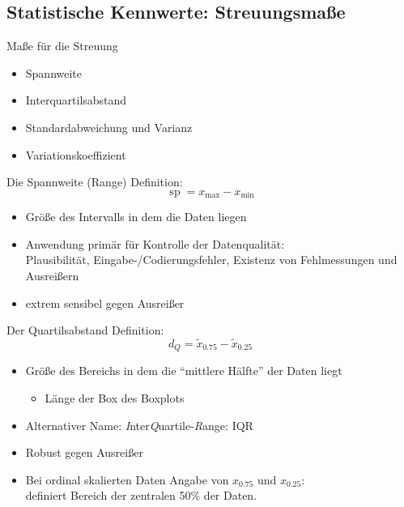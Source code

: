 \documentclass[
  10pt,
  ignorenonframetext,
]{beamer}
\providecommand{\tightlist}{%
  \setlength{\itemsep}{0pt}\setlength{\parskip}{0pt}}
\begin{document}
\hypertarget{statistische-kennwerte-streuungsmauxdfe}{%
\subsection{Statistische Kennwerte:
Streuungsmaße}\label{statistische-kennwerte-streuungsmauxdfe}}

\begin{frame}{Maße für die Streuung}
\protect\hypertarget{mauxdfe-fuxfcr-die-streuung}{}
\begin{itemize}
\tightlist
\item
  Spannweite
\item
  Interquartilsabstand
\item
  Standardabweichung und Varianz
\item
  Variationskoeffizient
\end{itemize}
\end{frame}

\begin{frame}{Die Spannweite (Range)}
\protect\hypertarget{die-spannweite-range}{}
Definition: \begin{equation*}
  \operatorname{sp} = x_{\max} - x_{\min}
\end{equation*}

\begin{itemize}
\tightlist
\item
  Größe des Intervalls in dem die Daten liegen
\item
  Anwendung primär für Kontrolle der Datenqualität:\\
  Plausibilität, Eingabe-/Codierungsfehler, Existenz von Fehlmessungen
  und Ausreißern
\item
  extrem sensibel gegen Ausreißer
\end{itemize}
\end{frame}

\begin{frame}{Der Quartilsabstand}
\protect\hypertarget{der-quartilsabstand}{}
Definition: \begin{equation*}
      d_Q = \tilde x_{0.75} - \tilde x_{0.25}
\end{equation*}

\begin{itemize}
\item
  Größe des Bereichs in dem die ``mittlere Hälfte'' der Daten liegt

  \begin{itemize}
  \tightlist
  \item
    Länge der Box des Boxplots
  \end{itemize}
\item
  Alternativer Name: \emph{I}nter\emph{Q}uartile-\emph{R}ange: IQR
\item
  Robust gegen Ausreißer
\item
  Bei ordinal skalierten Daten Angabe von \(x_{0.75}\) und
  \(x_{0.25}\):\\
  definiert Bereich der zentralen 50\% der Daten.
\end{itemize}
\end{frame}
\end{document}
